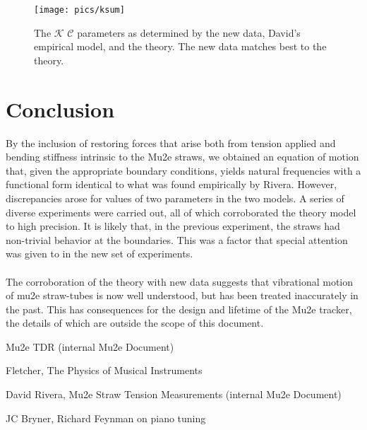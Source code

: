 \documentclass[twoside]{article}
\begin{document}
\begin{multicols}{2}
\begin{figure}[H]
	\texttt{[image: pics/ksum]}
	\caption{The  $\mathcal{K}$ $\mathcal{C}$  parameters as determined by the new data, David's empirical model, and the theory. The new data matches best to the theory.
	}
\end{figure}

\section{Conclusion}
By the inclusion of restoring forces that arise both from tension applied and bending stiffness intrinsic to the Mu2e straws, we obtained an equation of motion that, given the appropriate boundary conditions, yields natural frequencies with a functional form identical to what was found empirically by Rivera. However, discrepancies arose for values of two parameters in the two models.  A series of diverse experiments were carried out, all of which corroborated the theory model to high precision. It is likely that, in the previous experiment, the straws had non-trivial behavior at the boundaries. This was a factor that special attention was given to in the new set of experiments.  \\
\\
The corroboration of the theory with new data suggests that vibrational motion of mu2e straw-tubes is now well understood, but has been treated inaccurately in the past. This has consequences for the design and lifetime of the Mu2e tracker, the details of which are outside the scope of this document.







\begin{thebibliography}{99} %

Mu2e TDR (internal Mu2e Document)

Fletcher, The Physics of Musical Instruments

David Rivera, Mu2e Straw Tension Measurements (internal Mu2e Document)

JC Bryner, Richard Feynman on piano tuning



\end{thebibliography}


\end{multicols}
\end{document}
